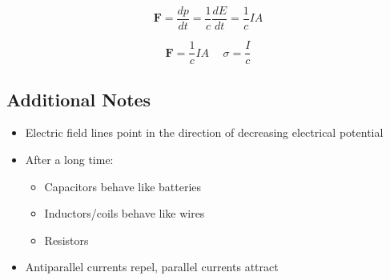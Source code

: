 \documentclass[twocolumn, 12pt]{article}
\begin{document}
\begin{equation*}
    \textbf{F}=\frac{dp}{dt} = \frac{1}{c}\frac{dE}{dt} = \frac{1}{c}\textit{I}A
\end{equation*}

\begin{equation*}
    \textbf{F} = \frac{1}{c}\textit{I}A \hspace{15pt} \sigma = \frac{\textit{I}}{c}
\end{equation*}

\subsection*{Additional Notes}
\begin{itemize}
    \item Electric field lines point in the direction of decreasing electrical potential
    \item After a long time: 
    \begin{itemize}
        \item Capacitors behave like batteries
        \item Inductors/coils behave like wires
        \item Resistors 
    \end{itemize}
    \item Antiparallel currents repel, parallel currents attract
\end{itemize}
\end{document}

